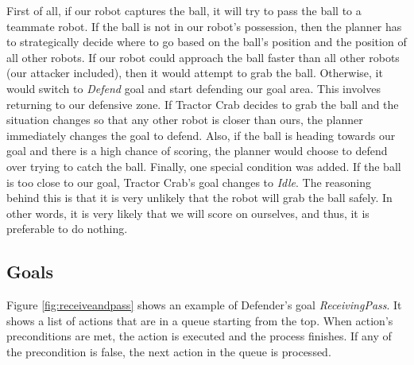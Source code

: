 \pagebreak

First of all, if our robot captures the ball, it will try to pass the ball to a teammate robot. If the ball is not in our robot's possession, then the planner has to strategically decide where to go based on the ball's position and the position of all other robots. If our robot could approach the ball faster than all other robots (our attacker included), then it would attempt to grab the ball. Otherwise, it would switch to \emph{Defend} goal and start defending our goal area. This involves returning to our defensive zone. If Tractor Crab decides to grab the ball and the situation changes so that any other robot is closer than ours, the planner immediately changes the goal to defend. Also, if the ball is heading towards our goal and there is a high chance of scoring, the planner would choose to defend over trying to catch the ball. Finally, one special condition was added. If the ball is too close to our goal, Tractor Crab's goal changes to \emph{Idle}. The reasoning behind this is that it is very unlikely that the robot will grab the ball safely. In other words, it is very likely that we will score on ourselves, and thus, it is preferable to do nothing.









\pagebreak
\subsection{Goals}

Figure \ref{fig:receiveandpass} shows an example of Defender's goal \emph{ReceivingPass}. It shows a list of actions that are in a queue starting from the top. When action's preconditions are met, the action is executed and the process finishes. If any of the precondition is false, the next action in the queue is processed.

